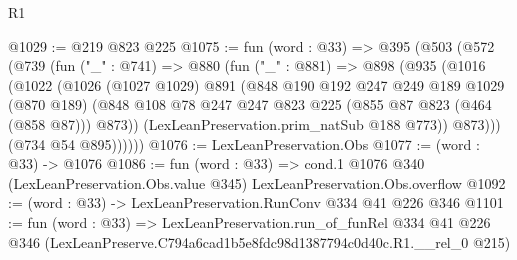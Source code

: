 \begin{lexlean}{R1}
\begin{coremodule}
@1029 := @219 @823 @225
@1075 := fun (word : @33) =>
  @395
    (@503
      (@572
        (@739
          (fun ("_" : @741) =>
          @880
            (fun ("_" : @881) =>
            @898
              (@935
                (@1016
                  (@1022
                    (@1026
                      (@1027 @1029)
                      @891
                      (@848
                        @190
                        @192
                        @247
                        @249
                        @189
                        @1029
                        (@870 @189)
                        (@848 @108 @78 @247 @247 @823 @225 (@855 @87 @823 (@464 (@858 @87))) @873))
                      (LexLeanPreservation.prim_natSub @188 @773))
                    @873)))
              (@734 @54 @895))))))
@1076 := LexLeanPreservation.Obs
@1077 := (word : @33) -> @1076
@1086 := fun (word : @33) =>
  cond.{1} @1076 @340 (LexLeanPreservation.Obs.value @345) LexLeanPreservation.Obs.overflow
@1092 := (word : @33) -> LexLeanPreservation.RunConv @334 @41 @226 @346
@1101 := fun (word : @33) =>
  LexLeanPreservation.run_of_funRel
    @334
    @41
    @226
    @346
    (LexLeanPreserve.C794a6cad1b5e8fdc98d1387794c0d40c.R1.__rel_0 @215)
\end{coremodule}
\end{lexlean}
